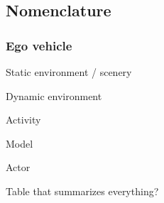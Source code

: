 \subsection{Nomenclature}
\label{sec:nomenclature}

\subsubsection{Ego vehicle}

Static environment / scenery

Dynamic environment

Activity

Model

Actor

Table that summarizes everything?
